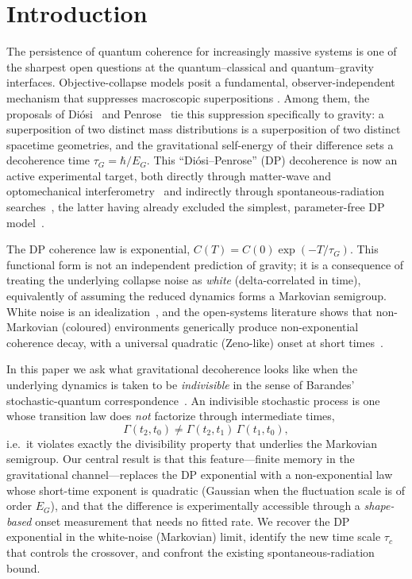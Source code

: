 \documentclass[aps,prd,onecolumn,amsmath,amssymb,nofootinbib,superscriptaddress]{revtex4-2}
\begin{document}
\maketitle

\section{Introduction}\label{sec:intro}

The persistence of quantum coherence for increasingly massive systems is one of the sharpest open
questions at the quantum--classical and quantum--gravity interfaces. Objective-collapse models
posit a fundamental, observer-independent mechanism that suppresses macroscopic superpositions
\cite{R4,R5,R6,R7}. Among them, the proposals of Di\'osi~\cite{R2,R3} and Penrose~\cite{R1} tie
this suppression specifically to gravity: a superposition of two distinct mass distributions is a
superposition of two distinct spacetime geometries, and the gravitational self-energy of their
difference sets a decoherence time $\tau_G=\hbar/E_G$. This ``Di\'osi--Penrose'' (DP) decoherence
is now an active experimental target, both directly through matter-wave and optomechanical
interferometry~\cite{R16,R19,R23,R26,R27} and indirectly through spontaneous-radiation
searches~\cite{R8,R9}, the latter having already excluded the simplest, parameter-free DP
model~\cite{R8}.

The DP coherence law is exponential, $C(T)=C(0)\exp(-T/\tau_G)$. This functional form is not an
independent prediction of gravity; it is a consequence of treating the underlying collapse noise as
\emph{white} (delta-correlated in time), equivalently of assuming the reduced dynamics forms a
Markovian semigroup. White noise is an idealization~\cite{R10}, and the open-systems literature
shows that non-Markovian (coloured) environments generically produce non-exponential coherence
decay, with a universal quadratic (Zeno-like) onset at short times~\cite{R15,R21,R22}.

In this paper we ask what gravitational decoherence looks like when the underlying dynamics is
taken to be \emph{indivisible} in the sense of Barandes' stochastic-quantum
correspondence~\cite{R11,R12}. An indivisible stochastic process is one whose transition law does
\emph{not} factorize through intermediate times,
\begin{equation}
\Gamma(t_2,t_0)\neq\Gamma(t_2,t_1)\,\Gamma(t_1,t_0),
\end{equation}
i.e.\ it violates exactly the divisibility property that underlies the Markovian semigroup. Our
central result is that this feature---finite memory in the gravitational channel---replaces the DP
exponential with a non-exponential law whose short-time exponent is quadratic (Gaussian when the
fluctuation scale is of order $E_G$), and that the difference is experimentally accessible through a
\emph{shape-based} onset measurement that needs no fitted rate. We recover the DP exponential in the
white-noise (Markovian) limit, identify the new time scale $\tau_c$ that controls the crossover, and
confront the existing spontaneous-radiation bound.
\end{document}
